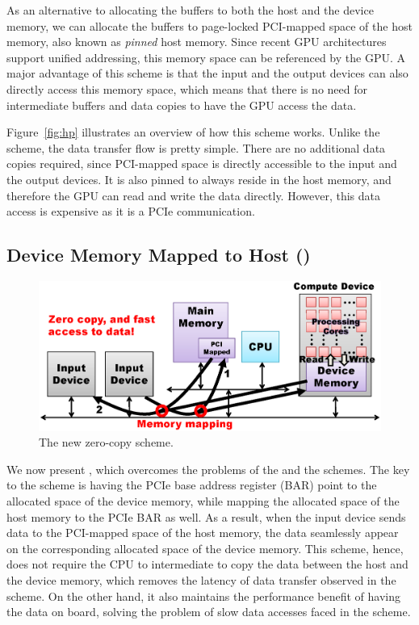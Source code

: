 As an alternative to allocating the buffers to both the host and the
device memory, we can allocate the buffers to page-locked PCI-mapped
space of the host memory, also known as \textit{pinned} host memory.
Since recent GPU architectures support unified addressing, this memory
space can be referenced by the GPU.
A major advantage of this scheme is that the input and the output
devices can also directly access this memory space, which means that
there is no need for intermediate buffers and data copies to have the
GPU access the data.

Figure~\ref{fig:hp} illustrates an overview of how this scheme works.
Unlike the {\hd} scheme, the data transfer flow is pretty simple.
There are no additional data copies required, since PCI-mapped space is
directly accessible to the input and the output devices.
It is also pinned to always reside in the host memory, and therefore the
GPU can read and write the data directly.
However, this data access is expensive as it is a PCIe communication.

\subsection{Device Memory Mapped to Host ({\dm})}
\label{sec:dm}

\begin{figure}[!t]
 \centering
 \includegraphics[width=\hsize]{eps/dm.eps}
 \caption{The new zero-copy {\dm} scheme.}
 \label{fig:dm}
\end{figure}

We now present {\dm}, which overcomes the problems of the {\hd} and the
{\hp} schemes.
The key to the {\dm } scheme is having the PCIe base address register
(BAR) point to the allocated space of the device memory, while mapping
the allocated space of the host memory to the PCIe BAR as well.
As a result, when the input device sends data to the PCI-mapped space of
the host memory, the data seamlessly appear on the corresponding
allocated space of the device memory.
This scheme, hence, does not require the CPU to intermediate to copy the
data between the host and the device memory, which removes the latency
of data transfer observed in the {\hd} scheme.
On the other hand, it also maintains the performance benefit of having
the data on board, solving the problem of slow data accesses faced in
the {\hp} scheme.

